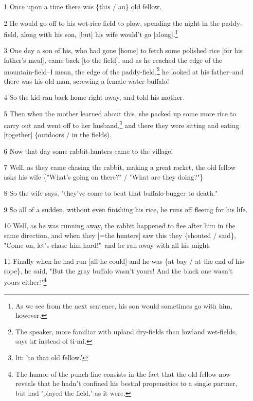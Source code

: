 
1 Once upon a time there was \{this / an\} old fellow.

2 He would go off to his wet-rice field to plow, spending the night in the paddy-field,
along with his son, [but] his wife would't go [along].\footnote{As we see from the next sentence, his son would sometimes go with him, however.}

3 One day a son of his, who had gone [home] to fetch some polished rice [for his
father's meal], came back [to the field], and as he reached the edge of the mountain-field--I
mean, the edge of the paddy-field,\footnote{The speaker, more familiar with upland dry-fields than lowland wet-fields, says hɛ instead of ti-mi.} he looked at his father--and there was his
old man, screwing a female water-buffalo!

4 So the kid ran back home right away, and told his mother.

5 Then when the mother learned about this, she packed up some more rice to carry
out and went off to her husband,\footnote{lit: 'to that old fellow.'} and there they were sitting and eating [together]
\{outdoors / in the fields).

6 Now that day some rabbit-hunters came to the village!

7 Well, as they came chasing the rabbit, making a great racket, the old fellow
asks his wife \{"What's going on there?" / "What are
they doing?"\}

8 So the wife says, "they've come to beat that buffalo-bugger to death."

9 So all of a sudden, without even finishing his rice, he runs off fleeing for
his life.

10 Well, as he was running away, the rabbit happened to flee after him in the same
direction, and when they [=the hunters] saw this they \{shouted / said\}, "Come
on, let's chase him hard!"--and he ran away with all his might.

11 Finally when he had run [all he could] and he was \{at bay / at the end of his
rope\}, he said, "But the gray buffalo wasn't yours! And the black one
wasn't yours either!"\footnote{The humor of the punch line consists in the fact that the old fellow now reveals that he hadn't confined his bestial propensities to a single partner, but had 'played the field,' as it were.}

